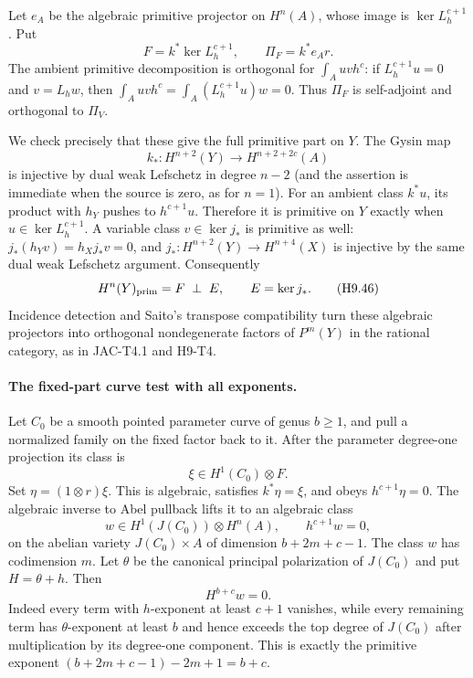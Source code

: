 Let $e_A$ be the algebraic primitive projector on $H^n(A)$, whose
image is $\ker L_h^{c+1}$. Put
\[
 F=k^*\ker L_h^{c+1},\qquad \Pi_F=k^*e_A r.
\]
The ambient primitive decomposition is orthogonal for
$\int_Auvh^c$: if $L_h^{c+1}u=0$ and $v=L_hw$, then
$\int_Auvh^c=\int_A(L_h^{c+1}u)w=0$.
Thus $\Pi_F$ is self-adjoint and orthogonal to $\Pi_V$.

We check precisely that these give the full primitive part on $Y$.
The Gysin map
\[
 k_*:H^{n+2}(Y)\longrightarrow H^{n+2+2c}(A)
\]
is injective by dual weak Lefschetz in degree $n-2$ (and the assertion
is immediate when the source is zero, as for $n=1$).
For an ambient class $k^*u$, its product with $h_Y$ pushes to
$h^{c+1}u$. Therefore it is primitive on $Y$ exactly when
$u\in\ker L_h^{c+1}$. A variable class $v\in\ker j_*$ is primitive
as well: $j_*(h_Yv)=h_Xj_*v=0$, and
$j_*:H^{n+2}(Y)\to H^{n+4}(X)$ is injective by the same dual weak
Lefschetz argument. Consequently
\[
 H^n(Y)_{\rm prim}=F\ \mathbin{\perp}\ E,
 \qquad E=\ker j_*.
                                                               \tag{H9.46}
\]
Incidence detection and Saito's transpose compatibility turn these
algebraic projectors into orthogonal nondegenerate factors of
$P^m(Y)$ in the rational category, as in JAC-T4.1 and H9-T4.

\paragraph{The fixed-part curve test with all exponents.}
Let $C_0$ be a smooth pointed parameter curve of genus $b\ge1$, and
pull a normalized family on the fixed factor back to it. After the
parameter degree-one projection its class is
\[
 \xi\in H^1(C_0)\otimes F.
\]
Set $\eta=(1\otimes r)\xi$. This is algebraic, satisfies
$k^*\eta=\xi$, and obeys $h^{c+1}\eta=0$.
The algebraic inverse to Abel pullback lifts it to an algebraic class
\[
 w\in H^1(J(C_0))\otimes H^n(A),
       \qquad h^{c+1}w=0,
\]
on the abelian variety $J(C_0)\times A$ of dimension
$b+2m+c-1$. The class $w$ has codimension $m$.
Let $\theta$ be the canonical principal polarization of $J(C_0)$
and put $H=\theta+h$. Then
\[
 H^{b+c}w=0.
\]
Indeed every term with $h$-exponent at least $c+1$ vanishes, while
every remaining term has $\theta$-exponent at least $b$ and hence
exceeds the top degree of $J(C_0)$ after multiplication by its
degree-one component. This is exactly the primitive exponent
$(b+2m+c-1)-2m+1=b+c$.

